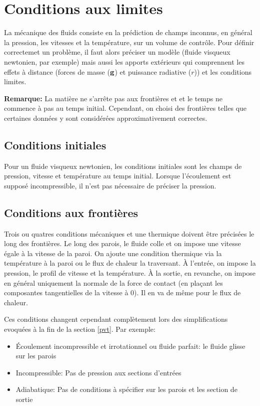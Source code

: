 \documentclass[a4paper,11pt]{report}
\begin{document}
  \section{Conditions aux limites}
    La mécanique des fluids consiste en la prédiction de champs inconnus, en général la pression, les vitesses et la température, sur un volume de contrôle. Pour définir correctemet un problème, il faut alors préciser un modèle (fluide visqueux newtonien, par exemple) mais aussi les apports extérieurs qui comprennent les effets à distance (forces de masse ($\vb{g}$) et puissance radiative ($r$)) et les conditions limites.

    {\footnotesize \textbf{Remarque:} La matière ne s'arrête pas aux frontières et et le temps ne commence à pas au temps initial. Cependant, on choisi des frontières telles que certaines données y sont considérées approximativement correctes.}

    \subsection{Conditions initiales}
      Pour un fluide visqueux newtonien, les conditions initiales sont les champs de pression, vitesse et température au temps initial. Lorsque l'écoulement est supposé incompressible, il n'est pas nécessaire de préciser la pression.

    \subsection{Conditions aux frontières}
      Trois ou quatres conditions mécaniques et une thermique doivent être précisées le long des frontières. Le long des parois, le fluide colle et on impose une vitesse égale à la vitesse de la paroi. On ajoute une condition thermique via la température à la paroi ou le flux de chaleur la traversant. À l'entrée, on impose la pression, le profil de vitesse et la température. À la sortie, en revanche, on impose en général uniquement la normale de la force de contact (en plaçant les composantes tangentielles de la vitesse à $0$). Il en va de même pour le flux de chaleur.

      Ces conditions changent cependant complètement lors des simplifications evoquées à la fin de la section \ref{pvt}. Par exemple:
      \begin{itemize}
        \item Écoulement incompressible et irrotationnel ou fluide parfait: le fluide glisse sur les parois
        \item Incompressible: Pas de pression aux sections d'entrées
        \item Adiabatique: Pas de conditions à spécifier sur les parois et les section de sortie
      \end{itemize}
\end{document}
